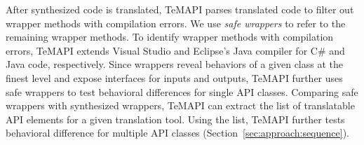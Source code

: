 After synthesized code is translated, TeMAPI parses translated code to filter out wrapper methods with compilation errors. We use \emph{safe wrappers} to refer to the remaining wrapper methods. To identify wrapper methods with compilation errors, TeMAPI extends Visual Studio and Eclipse's Java compiler for C\# and Java code, respectively.
Since wrappers reveal behaviors of a given class at the finest level and expose interfaces for inputs and outputs, TeMAPI further uses safe wrappers to test behavioral differences for single API classes. Comparing safe wrappers with synthesized wrappers, TeMAPI can extract the list of translatable API elements for a given translation tool. Using the list, TeMAPI further tests behavioral difference for multiple API classes (Section~\ref{sec:approach:sequence}).


%



